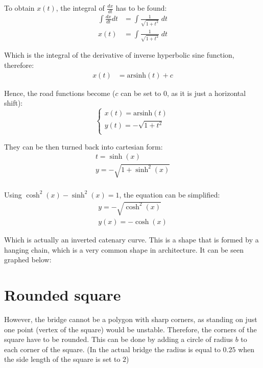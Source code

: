 \documentclass[12pt]{article}
\begin{document}
        To obtain $x(t)$, the integral of $\frac{dx}{dt}$ has to be found:
        \begin{align}
            \int \frac{dx}{dt} dt &= \int \frac{1}{\sqrt{1+t^2}} \;dt \\
            x(t) &= \int \frac{1}{\sqrt{1+t^2}} \;dt
        \end{align}

        Which is the integral of the derivative of inverse hyperbolic sine function\cite{oxford_dict}, therefore:
        \begin{align}
            x(t) &= \text{arsinh}(t) + c 
        \end{align}

        Hence, the road functions become ($c$ can be set to 0, as it is just a horizontal shift):
        \begin{equation}\label{eq:road_2}
            \begin{cases}
                x(t) = \text{arsinh}(t) \\
                y(t) = -\sqrt{1+t^2} \\
            \end{cases}
        \end{equation}

        They can be then turned back into cartesian form:
        \begin{align}
            t = \sinh(x) \\
            y = -\sqrt{1+\sinh^2(x)} \\ 
        \end{align}

        Using $\cosh^2(x) - \sinh^2(x) = 1$\cite{oxford_dict}, the equation can be simplified:
        \begin{align}
            y = -\sqrt{\cosh^2(x)} \\
            y(x) = -\cosh(x)
        \end{align}

        Which is actually an inverted catenary curve. This is a shape that is formed by a hanging chain, which is a very common shape in architecture. It can be seen graphed below:

    \section{Rounded square}

        However, the bridge cannot be a polygon with sharp corners, as standing on just one point (vertex of the square) would be unstable. Therefore, the corners of the square have to be rounded. This can be done by adding a circle of radius $b$ to each corner of the square. (In the actual bridge the radius is equal to $0.25$ when the side length of the square is set to $2$)
\end{document}
